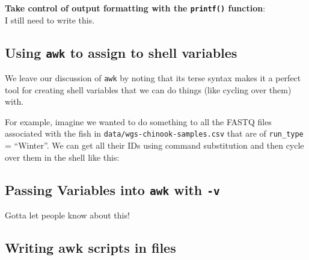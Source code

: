 \documentclass[]{krantz}
\makeatletter
\newenvironment{Shaded}{\begin{snugshade}}{\end{snugshade}}
\newcommand{\BuiltInTok}[1]{#1}
\newcommand{\ExtensionTok}[1]{#1}
\newcommand{\FunctionTok}[1]{\textcolor[rgb]{0,0,0}{#1}}
\newcommand{\KeywordTok}[1]{\textcolor[rgb]{0.27,0.27,0.27}{\textbf{#1}}}
\newcommand{\NormalTok}[1]{#1}
\newcommand{\StringTok}[1]{\textcolor[rgb]{0.5,0.5,0.5}{#1}}
\newcommand{\VariableTok}[1]{\textcolor[rgb]{0,0,0}{#1}}
\newenvironment{kframe}{%
\medskip{}
\setlength{\fboxsep}{.8em}
 \def\at@end@of@kframe{}%
 \ifinner\ifhmode%
  \def\at@end@of@kframe{\end{minipage}}%
  \begin{minipage}{\columnwidth}%
 \fi\fi%
 \def\FrameCommand##1{\hskip\@totalleftmargin \hskip-\fboxsep
 \colorbox{shadecolor}{##1}\hskip-\fboxsep
     \hskip-\linewidth \hskip-\@totalleftmargin \hskip\columnwidth}%
 \MakeFramed {\advance\hsize-\width
   \@totalleftmargin\z@ \linewidth\hsize
   \@setminipage}}%
 {\par\unskip\endMakeFramed%
 \at@end@of@kframe}
\renewenvironment{Shaded}{\begin{kframe}}{\end{kframe}}
\makeatother
\begin{document}
\textbf{Take control of output formatting with the \texttt{printf()} function}:\\
I still need to write this.

\hypertarget{using-awk-to-assign-to-shell-variables}{%
\subsection{\texorpdfstring{Using \texttt{awk} to assign to shell variables}{Using awk to assign to shell variables}}\label{using-awk-to-assign-to-shell-variables}}

We leave our discussion of \texttt{awk} by noting that its terse syntax makes it
a perfect tool for creating shell variables that we can do things (like
cycling over them) with.

For example, imagine we wanted to do something to all the FASTQ files associated with
the fish in \texttt{data/wgs-chinook-samples.csv} that are of \texttt{run\_type} = ``Winter''. We can
get all their IDs using command substitution and then cycle over them in the shell like this:

\begin{Shaded}
\end{Shaded}

\hypertarget{passing-variables-into-awk-with--v}{%
\subsection{\texorpdfstring{Passing Variables into \texttt{awk} with \texttt{-v}}{Passing Variables into awk with -v}}\label{passing-variables-into-awk-with--v}}

Gotta let people know about this!

\hypertarget{writing-awk-scripts-in-files}{%
\subsection{Writing awk scripts in files}\label{writing-awk-scripts-in-files}}
\end{document}
